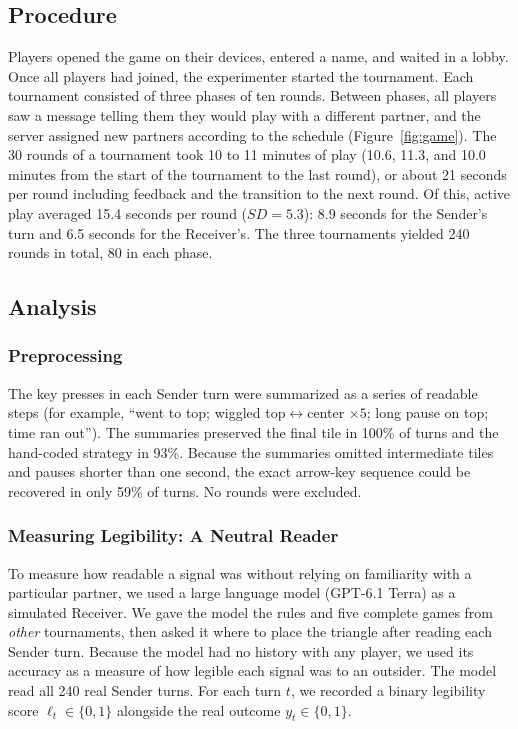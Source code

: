 \documentclass[stu,11pt,floatsintext,donotrepeattitle]{apa7}
\begin{document}
\subsection{Procedure}

Players opened the game on their devices, entered a name, and waited in a lobby. Once all players had joined, the experimenter started the tournament. Each tournament consisted of three phases of ten rounds. Between phases, all players saw a message telling them they would play with a different partner, and the server assigned new partners according to the schedule (Figure~\ref{fig:game}). The 30 rounds of a tournament took 10 to 11 minutes of play (10.6, 11.3, and 10.0 minutes from the start of the tournament to the last round), or about 21 seconds per round including feedback and the transition to the next round. Of this, active play averaged 15.4 seconds per round ($SD = 5.3$): 8.9 seconds for the Sender's turn and 6.5 seconds for the Receiver's. The three tournaments yielded 240 rounds in total, 80 in each phase.

\subsection{Analysis}

\subsubsection{Preprocessing}

The key presses in each Sender turn were summarized as a series of readable steps (for example, \enquote{went to top; wiggled top$\leftrightarrow$center $\times 5$; long pause on top; time ran out}). The summaries preserved the final tile in 100\% of turns and the hand-coded strategy in 93\%. Because the summaries omitted intermediate tiles and pauses shorter than one second, the exact arrow-key sequence could be recovered in only 59\% of turns. No rounds were excluded.

\subsubsection{Measuring Legibility: A Neutral Reader}

To measure how readable a signal was without relying on familiarity with a particular partner, we used a large language model (GPT-6.1 Terra) as a simulated Receiver. We gave the model the rules and five complete games from \emph{other} tournaments, then asked it where to place the triangle after reading each Sender turn. Because the model had no history with any player, we used its accuracy as a measure of how legible each signal was to an outsider. The model read all 240 real Sender turns. For each turn $t$, we recorded a binary legibility score $\ell_t \in \{0, 1\}$ alongside the real outcome $y_t \in \{0, 1\}$.
\end{document}
